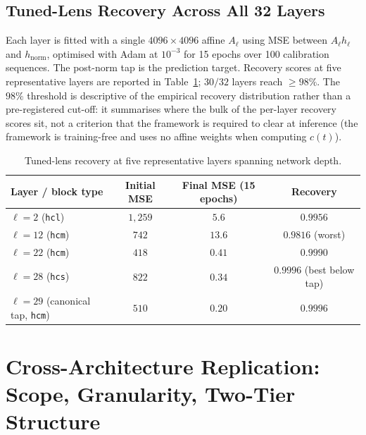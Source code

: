 \documentclass{article}
\theoremstyle{plain}
\theoremstyle{definition}
\theoremstyle{remark}
\newcommand{\hnorm}{h_{\mathrm{norm}}}
\begin{document}
\subsection{Tuned-Lens Recovery Across All 32 Layers}
\label{app:tuned-lens}

Each layer is fitted with a single $4096 \times 4096$ affine $A_{\ell}$
using MSE between $A_{\ell} h_{\ell}$ and $\hnorm$, optimised with Adam
at $10^{-3}$ for 15 epochs over 100 calibration sequences. The
post-norm tap is the prediction target. Recovery scores at five
representative layers are reported in Table~\ref{tab:tuned-lens};
$30/32$ layers reach $\ge 98\%$. The $98\%$ threshold is descriptive of
the empirical recovery distribution rather than a pre-registered
cut-off: it summarises where the bulk of the per-layer recovery scores
sit, not a criterion that the framework is required to clear at
inference (the framework is training-free and uses no affine weights
when computing $c(t)$).

\begin{table}[!htbp]
  \caption{Tuned-lens recovery at five representative layers spanning
  network depth.}
  \label{tab:tuned-lens}
  \centering
  \small
  \begin{tabular}{@{}lccc@{}}
    \toprule
    Layer / block type & Initial MSE & Final MSE (15 epochs) & Recovery \\
    \midrule
    $\ell=2$ (\texttt{hcl}) & $1{,}259$ & $5.6$ & $0.9956$ \\
    $\ell=12$ (\texttt{hcm}) & $742$ & $13.6$ & $0.9816$ (worst) \\
    $\ell=22$ (\texttt{hcm}) & $418$ & $0.41$ & $0.9990$ \\
    $\ell=28$ (\texttt{hcs}) & $822$ & $0.34$ & $0.9996$ (best below tap) \\
    $\ell=29$ (canonical tap, \texttt{hcm}) & $510$ & $0.20$ & $0.9996$ \\
    \bottomrule
  \end{tabular}
\end{table}

\section{Cross-Architecture Replication: Scope, Granularity, Two-Tier Structure}
\label{app:cross-arch}
\end{document}
